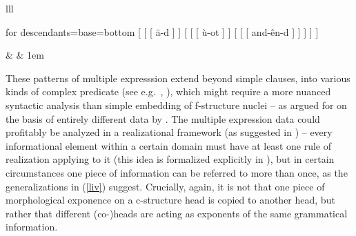 \documentclass[output=paper,hidelinks]{langscibook}
\begin{document}
\ea\label{ex:Minimalism:31}%
\begin{tabular}[t]{lll}
\begin{forest}
  for descendants={base=bottom}
  [   [  [ \"a-d ] ] 
      [ 
        [  [ \`u-ot ] ]
          [  [  [ and-\^en-d ] ] ]
      ]
   ]    
\end{forest}
& \phantom{more space} &
\lower1em\hbox{}
\end{tabular}
\z

These patterns of multiple expresssion extend beyond simple clauses,
into various kinds of complex predicate (see e.g.~\citealp{Sells2004},
\citealp{Lodrup2014}), which might require a more nuanced syntactic
analysis than simple embedding of f-structure nuclei -- as argued for
on the basis of entirely different data by
\citet{AndrewsManning1999}. The multiple expression data could
profitably be analyzed in a realizational framework (as suggested in
\citealp{Sells2004}) -- every informational element within a certain
domain must have at least one rule of realization applying to it (this
idea is formalized explicitly in \citealp{crysbona16}), but in certain
circumstances one piece of information can be referred to more than
once, as the generalizations in (\ref{liv}) suggest. Crucially, again,
it is not that one piece of morphological exponence on a c-structure
head is copied to another head, but rather that different (co-)heads
are acting as exponents of the same grammatical information.
\end{document}
